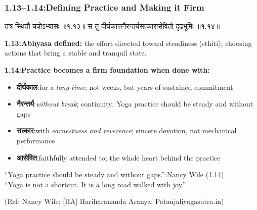 \begin{frame}[fragile]\frametitle{1.13–1.14:Defining Practice and Making it Firm}

\begin{sanskrit}
तत्र स्थितौ यत्नोऽभ्यासः ॥१.१३॥
स तु दीर्घकालनैरन्तर्यसत्कारासेवितो दृढभूमिः ॥१.१४॥
\end{sanskrit}

\textbf{1.13:Abhyasa defined:} the effort directed toward steadiness (sthiti); choosing actions that bring a stable and tranquil state.

\textbf{1.14:Practice becomes a firm foundation when done with:}
\begin{itemize}
\item \textbf{दीर्घकाल}:for a \emph{long time}; not weeks, but years of sustained commitment
\item \textbf{नैरन्तर्य}:\emph{without break}; continuity; Yoga practice should be steady and without gaps
\item \textbf{सत्कार}:with \emph{earnestness and reverence}; sincere devotion, not mechanical performance
\item \textbf{आसेवित}:faithfully attended to; the whole heart behind the practice
\end{itemize}

\vspace{2mm}
\begin{center}
{\small ``Yoga practice should be steady and without gaps.'':Nancy Wile (1.14)\\
``Yoga is not a shortcut. It is a long road walked with joy.''}
\end{center}

\tiny{(Ref: Nancy Wile; [HA] Hariharananda Aranya; Patanjaliyogasutra.in)}

\end{frame}

